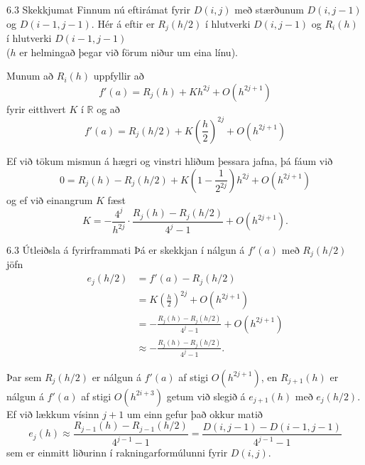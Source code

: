 \begin{frame}{6.3 Skekkjumat}
Finnum nú eftirámat fyrir $D(i,j)$ með stærðunum 
$D(i,j-1)$ og $D(i-1,j-1)$. Hér á eftir er $R_j(h/2)$ í hlutverki $D(i,j-1)$ og 
$R_i(h)$ í hlutverki $D(i-1,j-1)$ \\
($h$ er helmingað þegar við förum niður um eina línu).

\pause
\smallskip
Munum að $R_i(h)$ uppfyllir að
\begin{equation*}
  f'(a) = R_j(h) + Kh^{2j} + O(h^{2j+1})
\end{equation*}
fyrir eitthvert $K$ í $\mathbb R$ og að
\begin{equation*}
  f'(a) = R_j(h/2) + K \left( \frac{h}{2} \right)^{2j}
  + O(h^{2j+1})
\end{equation*}

\pause
\smallskip
Ef við tökum mismun á hægri og vinstri hliðum þessara jafna, þá fáum
við 
\begin{equation*}
  0 = R_j(h) - R_j(h/2) + K \left(1 - \frac{1}{2^{2j}}\right)h^{2j}
  + O(h^{2j+1})
\end{equation*}
og ef við einangrum $K$ fæst
$$
  K = -\frac{4^{j}}{h^{2j}} \cdot \frac{R_j(h)-R_j(h/2)}{4^{j}-1} +
O(h^{2j+1}).
$$
\end{frame}


\begin{frame}{6.3 Útleiðsla á fyrirframmati} 
Þá er skekkjan í nálgun á $f'(a)$ með $R_j(h/2)$ jöfn
\begin{align*}
  e_j(h/2) &= f'(a) - R_j(h/2) \\
  &= K\left(\frac{h}{2}\right)^{2j} + O(h^{2j+1}) \\
  &= -\frac{R_j(h)-R_j(h/2)}{4^{j}-1} + O(h^{2j+1}) \\
  &\approx -\frac{R_j(h)-R_j(h/2)}{4^{j}-1}.
\end{align*}

\pause
Þar sem $R_j(h/2)$ er nálgun á $f'(a)$ af stigi $O(h^{2j+1})$, en
$R_{j+1}(h)$ er nálgun á $f'(a)$ af stigi $O(h^{2i+3})$ getum við
slegið á $e_{j+1}(h)$ með $e_j(h/2)$. Ef við lækkum vísinn $j+1$ um
einn gefur það okkur matið 
\begin{equation*}
  e_j(h) \approx \frac{R_{j-1}(h)-R_{j-1}(h/2)}{4^{j-1}-1} =
  \frac{D(i,j-1)-D(i-1,j-1)}{4^{j-1}-1}
\end{equation*}
sem er einmitt liðurinn í rakningarformúlunni fyrir $D(i,j)$. 
\end{frame}


% 
% 
% 

